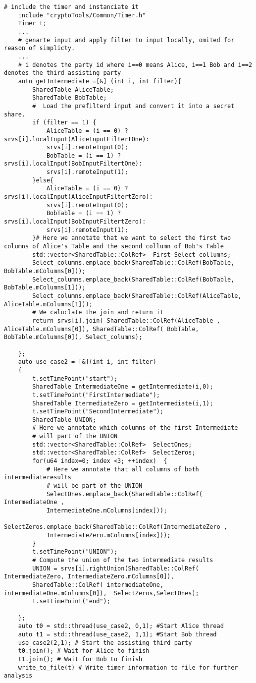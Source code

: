  \begin{lstlisting}[caption={Simpifiyed Protocol for our second use case in ABY3}]
	# include the timer and instanciate it
	include "cryptoTools/Common/Timer.h"
	Timer t;
	...
	# genarte input and apply filter to input locally, omited for reason of simplicty.
	...
	# i denotes the party id where i==0 means Alice, i==1 Bob and i==2 denotes the third assisting party
	auto getIntermediate =[&] (int i, int filter){
		SharedTable AliceTable;
		SharedTable BobTable;
		#  Load the prefilterd input and convert it into a secret share. 
		if (filter == 1) { 
			AliceTable = (i == 0) ? srvs[i].localInput(AliceInputFiltertOne): 
			srvs[i].remoteInput(0); 
			BobTable = (i == 1) ? srvs[i].localInput(BobInputFiltertOne): 
			srvs[i].remoteInput(1);
		}else{
			AliceTable = (i == 0) ? srvs[i].localInput(AliceInputFiltertZero): 
			srvs[i].remoteInput(0);
			BobTable = (i == 1) ? srvs[i].localInput(BobInputFiltertZero): 
			srvs[i].remoteInput(1);
		}# Here we annotate that we want to select the first two columns of Alice's Table and the second collumn of Bob's Table
		std::vector<SharedTable::ColRef>  First_Select_collumns; 
		Select_columns.emplace_back(SharedTable::ColRef(BobTable, BobTable.mColumns[0]));
		Select_columns.emplace_back(SharedTable::ColRef(BobTable, BobTable.mColumns[1]));
		Select_columns.emplace_back(SharedTable::ColRef(AliceTable, AliceTable.mColumns[1]));
		# We caluclate the join and return it
		return srvs[i].join( SharedTable::ColRef(AliceTable , AliceTable.mColumns[0]), SharedTable::ColRef( BobTable, BobTable.mColumns[0]), Select_columns);
		
	};
	auto use_case2 = [&](int i, int filter)
	{
		t.setTimePoint("start"); 
		SharedTable IntermediateOne = getIntermediate(i,0);
		t.setTimePoint("FirstIntermediate"); 
		SharedTable ItermediateZero = getIntermediate(i,1);
		t.setTimePoint("SecondIntermediate");
		SharedTable UNION;
		# Here we annotate which columns of the first Intermediate 
		# will part of the UNION
		std::vector<SharedTable::ColRef>  SelectOnes; 
		std::vector<SharedTable::ColRef>  SelectZeros; 
		for(u64 index=0; index <3; ++index)  {
			# Here we annotate that all columns of both intermediateresults 
			# will be part of the UNION
			SelectOnes.emplace_back(SharedTable::ColRef( IntermediateOne , 
			IntermediateOne.mColumns[index]));
			SelectZeros.emplace_back(SharedTable::ColRef(IntermediateZero , 
			IntermediateZero.mColumns[index]));
		}
		t.setTimePoint("UNION");
		# Compute the union of the two intermediate results
		UNION = srvs[i].rightUnion(SharedTable::ColRef( IntermediateZero, IntermediateZero.mColumns[0]),
		SharedTable::ColRef( intermediateOne, intermediateOne.mColumns[0]),  SelectZeros,SelectOnes);
		t.setTimePoint("end");
		
	};
	auto t0 = std::thread(use_case2, 0,1); #Start Alice thread
	auto t1 = std::thread(use_case2, 1,1); #Start Bob thread
	use_case2(2,1); # Start the assisting third party
	t0.join(); # Wait for Alice to finish
	t1.join(); # Wait for Bob to finish
	write_to_file(t) # Write timer information to file for further analysis
\end{lstlisting}

